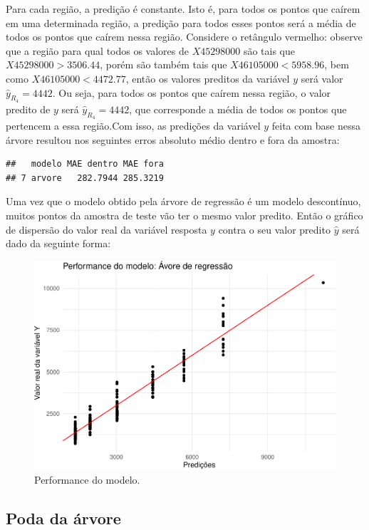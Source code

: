 \documentclass[11pt,]{article}
\begin{document}
Para cada região, a predição é constante. Isto é, para todos os pontos
que caírem em uma determinada região, a predição para todos esses pontos
será a média de todos os pontos que caírem nessa região. Considere o
retângulo vermelho: observe que a região para qual todos os valores de
\(X45298000\) são tais que \(X45298000> 3506.44\), porém são também tais
que \(X46105000<5958.96\), bem como \(X46105000<4472.77\), então os
valores preditos da variável \(y\) será valor \(\hat{y}_{R_4} = 4442\).
Ou seja, para todos os pontos que caírem nessa região, o valor predito
de \(y\) será \(\hat{y}_{R_4} = 4442\), que corresponde a média de todos
os pontos que pertencem a essa região.Com isso, as predições da variável
\(y\) feita com base nessa árvore resultou nos seguintes erros absoluto
médio dentro e fora da amostra:

\begin{verbatim}
##   modelo MAE dentro MAE fora
## 7 arvore   282.7944 285.3219
\end{verbatim}

Uma vez que o modelo obtido pela árvore de regressão é um modelo
descontínuo, muitos pontos da amostra de teste vão ter o mesmo valor
predito. Então o gráfico de dispersão do valor real da variável resposta
\(y\) contra o seu valor predito \(\hat{y}\) será dado da seguinte
forma:

\begin{figure}

{\centering \includegraphics[width=0.6\linewidth]{figs/unnamed-chunk-15} 

}

\caption{Performance do modelo.}\label{fig:unnamed-chunk-15}
\end{figure}

\hypertarget{poda-da-uxe1rvore-1}{%
\subsection{Poda da árvore}\label{poda-da-uxe1rvore-1}}
\end{document}
